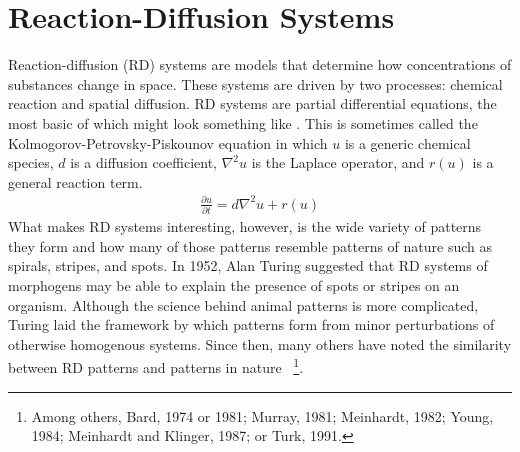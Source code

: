 \chapter{Reaction-Diffusion Systems}

	Reaction-diffusion (RD) systems are models that determine how concentrations of substances change in space. These systems are driven by two processes: chemical reaction and spatial diffusion. RD systems are partial differential equations, the most basic of which might look something like . This is sometimes called the Kolmogorov-Petrovsky-Piskounov equation in which $u$ is a generic chemical species, $d$ is a diffusion coefficient, $\nabla^2 u$ is the Laplace operator, and $r(u)$ is a general reaction term.
	\begin{align}
		\frac{\partial u}{\partial t} = d \nabla^2 u + r(u)
		\label{eq:KPP}
	\end{align}
What makes RD systems interesting, however, is the wide variety of patterns they form and how many of those patterns resemble patterns of nature such as spirals, stripes, and spots. In 1952, Alan Turing suggested that RD systems of morphogens may be able to explain the presence of spots or stripes on an organism. Although the science behind animal patterns is more complicated, Turing laid the framework by which patterns form from minor perturbations of otherwise homogenous systems. Since then, many others have noted the similarity between RD patterns and patterns in nature~
\footnote{Among others, Bard, 1974 or 1981; Murray, 1981; Meinhardt, 1982; Young, 1984; Meinhardt and Klinger, 1987; or Turk, 1991.}.
	
	
